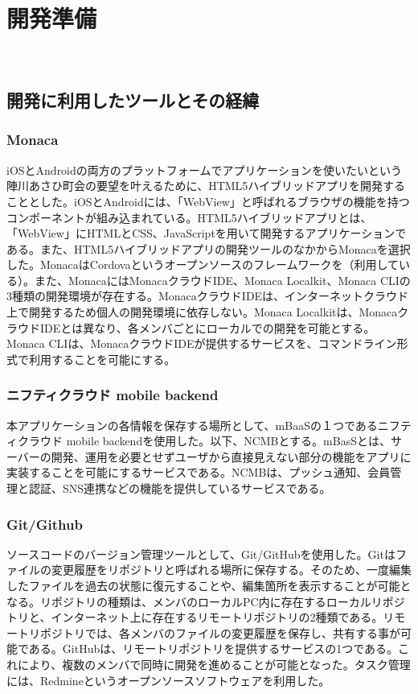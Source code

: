 \chapter{開発準備}
​
\section{開発に利用したツールとその経緯}%
\subsection{Monaca}%
iOSとAndroidの両方のプラットフォームでアプリケーションを使いたいという陣川あさひ町会の要望を叶えるために、HTML5ハイブリッドアプリを開発することとした。iOSとAndroidには、「WebView」と呼ばれるブラウザの機能を持つコンポーネントが組み込まれている。HTML5ハイブリッドアプリとは、「WebView」にHTMLとCSS、JavaScriptを用いて開発するアプリケーションである。また、HTML5ハイブリッドアプリの開発ツールのなかからMonacaを選択した。MonacaはCordovaというオープンソースのフレームワークを（利用している）。また、MonacaにはMonacaクラウドIDE、Monaca Localkit、Monaca CLIの3種類の開発環境が存在する。MonacaクラウドIDEは、インターネットクラウド上で開発するため個人の開発環境に依存しない。Monaca Localkitは、MonacaクラウドIDEとは異なり、各メンバごとにローカルでの開発を可能とする。Monaca CLIは、MonacaクラウドIDEが提供するサービスを、コマンドライン形式で利用することを可能にする。
​
\subsection{ニフティクラウド mobile backend}%
本アプリケーションの各情報を保存する場所として、mBaaSの１つであるニフティクラウド mobile backendを使用した。以下、NCMBとする。mBasSとは、サーバーの開発、運用を必要とせずユーザから直接見えない部分の機能をアプリに実装することを可能にするサービスである。NCMBは、プッシュ通知、会員管理と認証、SNS連携などの機能を提供しているサービスである。
​
​
\subsection{Git/Github}%
ソースコードのバージョン管理ツールとして、Git/GitHubを使用した。Gitはファイルの変更履歴をリポジトリと呼ばれる場所に保存する。そのため、一度編集したファイルを過去の状態に復元することや、編集箇所を表示することが可能となる。リポジトリの種類は、メンバのローカルPC内に存在するローカルリポジトリと、インターネット上に存在するリモートリポジトリの2種類である。リモートリポジトリでは、各メンバのファイルの変更履歴を保存し、共有する事が可能である。GitHubは、リモートリポジトリを提供するサービスの1つである。これにより、複数のメンバで同時に開発を進めることが可能となった。タスク管理には、Redmineというオープンソースソフトウェアを利用した。
​
​
